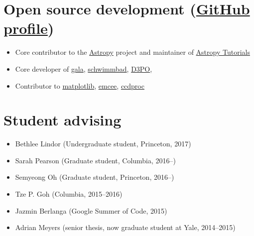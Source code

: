 \documentclass[12pt,letterpaper]{article}
\begin{document}
\begin{itemize}

\end{itemize}


\section*{Open source development (\href{https://github.com/adrn}{GitHub profile})}

\begin{itemize}

	\item Core contributor to the \href{http://www.astropy.org/}{Astropy} project and maintainer of \href{http://tutorials.astropy.org/}{Astropy Tutorials}
	\item Core developer of \href{http://gala.adrian.pw}{gala}, \href{https://github.com/adrn/schwimmbad}{schwimmbad}, \href{http://d3po.org}{D3PO},
	\item Contributor to \href{http://matplotlib.org/}{matplotlib}, \href{http://dan.iel.fm/emcee/current/}{emcee}, \href{https://github.com/astropy/ccdproc}{ccdproc}

\end{itemize}


\section*{Student advising}

\begin{itemize}
	\item Bethlee Lindor (Undergraduate student, Princeton, 2017)
    \item Sarah Pearson (Graduate student, Columbia, 2016--)
    \item Semyeong Oh (Graduate student, Princeton, 2016--)
	\item Tze P. Goh (Columbia, 2015--2016)
	\item Jazmin Berlanga (Google Summer of Code, 2015)
	\item Adrian Meyers (senior thesis, now graduate student at Yale, 2014--2015)
\end{itemize}
\end{document}
